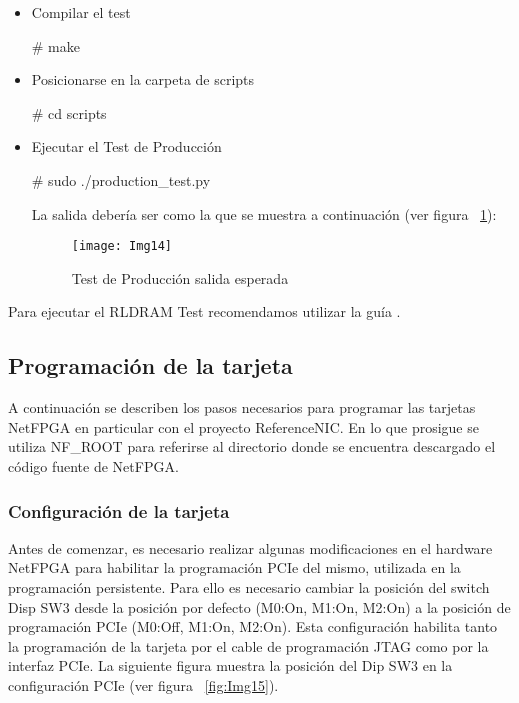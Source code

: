 \begin{itemize}
\begin{itemize}
\item Compilar el test
\begin{bash}
# make
\end{bash}

\item Posicionarse en la carpeta de scripts
\begin{bash}
# cd scripts
\end{bash}

\item Ejecutar el Test de Producción
\begin{bash}
# sudo ./production_test.py
\end{bash}

La salida debería ser como la que se muestra a continuación (ver figura ~\ref{fig:Img14}):

\newpage
\begin{figure}[htbp!] 
\centering    
\texttt{[image: Img14]}
\caption[Test de Producción salida esperada]{Test de Producción salida esperada}
\label{fig:Img14}
\end{figure}
\end{itemize}

\end{itemize}

Para ejecutar el RLDRAM Test recomendamos utilizar la guía \citep{NetFPGA8}.

\subsection{Programación de la tarjeta}

A continuación se describen los pasos necesarios para programar las tarjetas NetFPGA en particular con el proyecto ReferenceNIC. En lo que prosigue se utiliza NF\_ROOT para referirse al directorio donde se encuentra descargado el código fuente de NetFPGA.

\subsubsection{Configuración de la tarjeta}
Antes de comenzar, es necesario realizar algunas modificaciones en el hardware NetFPGA para habilitar la programación PCIe del mismo, utilizada en la programación persistente. Para ello es necesario cambiar la posición del switch Disp SW3 desde la posición por defecto (M0:On, M1:On, M2:On) a la posición de programación PCIe (M0:Off, M1:On, M2:On). Esta configuración habilita tanto la programación de la tarjeta por el cable de programación JTAG como por la interfaz PCIe. La siguiente figura muestra la posición del Dip SW3 en la configuración PCIe (ver figura ~\ref{fig:Img15}).

